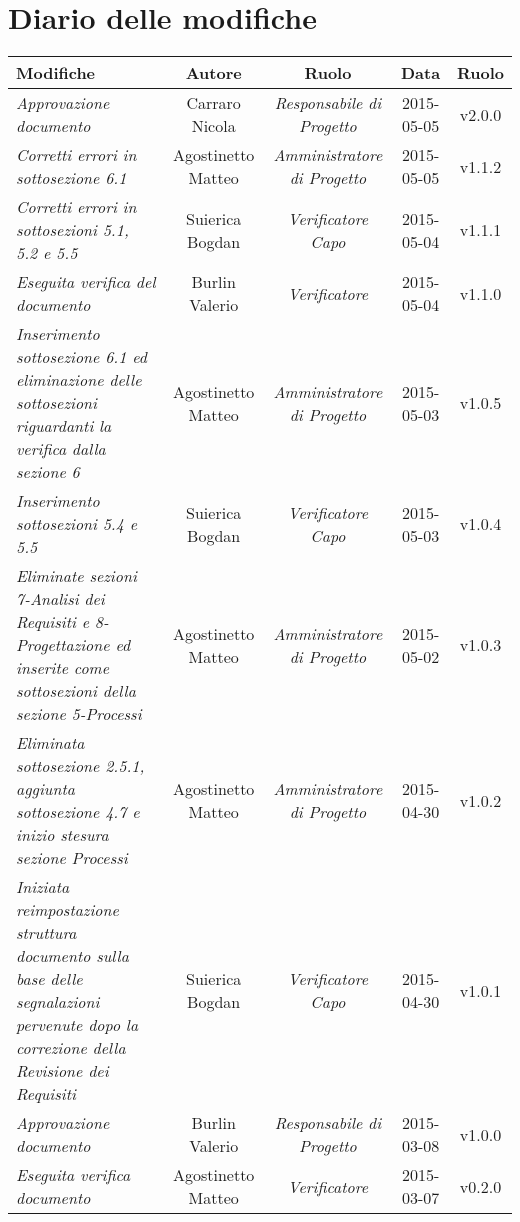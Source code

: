 \newpage
\section*{Diario delle modifiche}

\begin{table}[h]
\centering
\begin{tabular}{|p{}|c|c|c|c|}
	\toprule
		\textbf{Modifiche} & \textbf{Autore} & \textbf{Ruolo} & \textbf{Data} & \textbf{Ruolo} \\
	\midrule
	\midrule
		\textit{Approvazione documento} & Carraro Nicola & \textit{Responsabile di Progetto} & 2015-05-05 & v2.0.0 \\
	\midrule
		\textit{Corretti errori in sottosezione 6.1} & Agostinetto Matteo & \textit{Amministratore di Progetto} & 2015-05-05 & v1.1.2 \\
	\midrule
		\textit{Corretti errori in sottosezioni 5.1, 5.2 e 5.5} & Suierica Bogdan & \textit{Verificatore Capo} & 2015-05-04 & v1.1.1 \\
	\midrule
		\textit{Eseguita verifica del documento} & Burlin Valerio & \textit{Verificatore} & 2015-05-04 & v1.1.0 \\
	\midrule
		\textit{Inserimento sottosezione 6.1 ed eliminazione delle sottosezioni riguardanti la verifica dalla sezione 6} & Agostinetto Matteo & \textit{Amministratore di Progetto} & 2015-05-03 & v1.0.5 \\
	\midrule
		\textit{Inserimento sottosezioni 5.4 e 5.5} & Suierica Bogdan & \textit{Verificatore Capo} & 2015-05-03 & v1.0.4 \\
	\midrule
		\textit{Eliminate sezioni 7-Analisi dei Requisiti e 8-Progettazione ed inserite come sottosezioni della sezione 5-Processi} & Agostinetto Matteo & \textit{Amministratore di Progetto} & 2015-05-02 & v1.0.3 \\
	\midrule
		\textit{Eliminata sottosezione 2.5.1, aggiunta sottosezione 4.7 e inizio stesura sezione Processi} & Agostinetto Matteo & \textit{Amministratore di Progetto} & 2015-04-30 & v1.0.2 \\ 
	\midrule
		\textit{Iniziata reimpostazione struttura documento sulla base delle segnalazioni pervenute dopo la correzione della Revisione dei Requisiti} & Suierica Bogdan & \textit{Verificatore Capo} & 2015-04-30 & v1.0.1 \\
	\midrule
		\textit{Approvazione documento} & Burlin Valerio & \textit{Responsabile di Progetto} & 2015-03-08 & v1.0.0 \\
	\midrule
		\textit{Eseguita verifica documento} & Agostinetto Matteo & \textit{Verificatore} & 2015-03-07 & v0.2.0 \\

\end{tabular}
\end{table}
